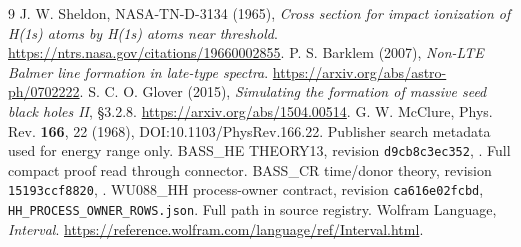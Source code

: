 \documentclass[11pt,a4paper]{article}
\begin{document}
\begin{thebibliography}{9}\small
{} J. W. Sheldon, NASA-TN-D-3134 (1965), \emph{Cross section for impact ionization of H(1s) atoms by H(1s) atoms near threshold}. \url{https://ntrs.nasa.gov/citations/19660002855}.
 P. S. Barklem (2007), \emph{Non-LTE Balmer line formation in late-type spectra}. \url{https://arxiv.org/abs/astro-ph/0702222}.
 S. C. O. Glover (2015), \emph{Simulating the formation of massive seed black holes II}, \S3.2.8. \url{https://arxiv.org/abs/1504.00514}.
 G. W. McClure, Phys. Rev. \textbf{166}, 22 (1968), DOI:10.1103/PhysRev.166.22. Publisher search metadata used for energy range only.
 BASS\_HE THEORY13, revision \texttt{d9cb8c3ec352}, . Full compact proof read through connector.
 BASS\_CR time/donor theory, revision \texttt{15193ccf8820}, .
 WU088\_HH process-owner contract, revision \texttt{ca616e02fcbd}, \texttt{HH\_PROCESS\_OWNER\_ROWS.json}. Full path in source registry.
 Wolfram Language, \emph{Interval}. \url{https://reference.wolfram.com/language/ref/Interval.html}.
\end{thebibliography}
\end{document}

